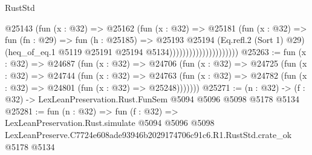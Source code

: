\begin{lexlean}{RustStd}
\begin{coremodule}
                                    @25143
                                      (fun (x : @32) =>
                                      @25162
                                        (fun (x : @32) =>
                                        @25181
                                          (fun (x : @32) =>
                                          fun (fn : @29) =>
                                          fun (h : @25185) =>
                                          @25193
                                            @25194
                                            (Eq.refl.{2} (Sort 1) @29)
                                            (heq_of_eq.{1}
                                              @5119
                                              @25191
                                              @25194
                                              @5134)))))))))))))))))))))
@25263 := fun (x : @32) =>
  @24687
    (fun (x : @32) =>
    @24706
      (fun (x : @32) =>
      @24725
        (fun (x : @32) =>
        @24744
          (fun (x : @32) =>
          @24763 (fun (x : @32) => @24782 (fun (x : @32) => @24801 (fun (x : @32) => @25248)))))))
@25271 := (n : @32) -> (f : @32) -> LexLeanPreservation.Rust.FunSem @5094 @5096 @5098 @5178 @5134
@25281 := fun (n : @32) =>
  fun (f : @32) =>
  LexLeanPreservation.Rust.simulate
    @5094
    @5096
    @5098
    LexLeanPreserve.C7724e608ade93946b2029174706c91c6.R1.RustStd.crate_ok
    @5178
    @5134
\end{coremodule}
\end{lexlean}
